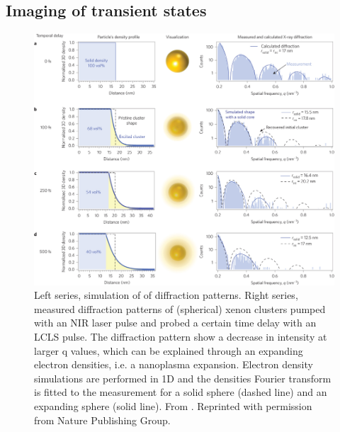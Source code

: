 \subsection{Imaging of transient states}
\begin{figure}
	\centering
		\includegraphics[width=1.00\textwidth]{images/tais-nat-photonics.jpg}
	\caption[Measurement and simulation of the nanoplasma expansion in xenon cluster.]{Left series, simulation of of diffraction patterns. Right series, measured diffraction patterns of (spherical) xenon clusters pumped with an NIR laser pulse and probed a certain time delay with an LCLS pulse. The diffraction pattern show a decrease in intensity at larger q values, which can be explained through an expanding electron densities, i.e. a nanoplasma expansion. Electron density simulations are performed in 1D and the densities Fourier transform is fitted to the measurement for a solid sphere (dashed line) and an expanding sphere (solid line). From \citep{Gorkhover-2016-NatPho}. Reprinted with permission from Nature Publishing Group.}
	\label{fig:tais-nat-photonics}
\end{figure}
